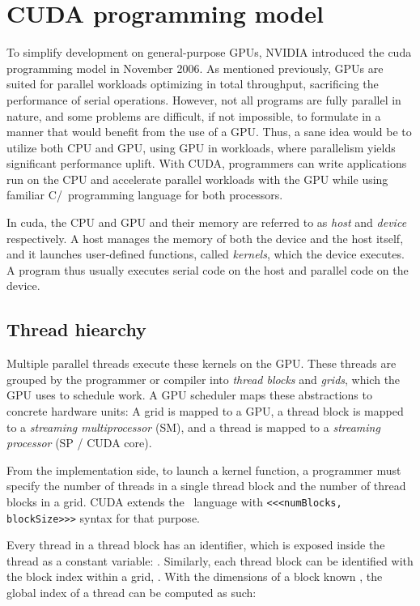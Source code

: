 \section{CUDA programming model} \label{label:cuda}

To simplify development on general-purpose GPUs, NVIDIA introduced the \acrfull{cuda} programming model in November 2006. As mentioned previously, GPUs are suited for parallel workloads optimizing in total throughput, sacrificing the performance of serial operations. However, not all programs are fully parallel in nature, and some problems are difficult, if not impossible, to formulate in a manner that would benefit from the use of a GPU. Thus, a sane idea would be to utilize both CPU and GPU, using GPU in workloads, where parallelism yields significant performance uplift. With CUDA, programmers can write applications run on the CPU and accelerate parallel workloads with the GPU while using familiar C/\CC\ programming language for both processors.

In \acrshort{cuda}, the CPU and GPU and their memory are referred to as \textit{host} and \textit{device} respectively. A host manages the memory of both the device and the host itself, and it launches user-defined functions, called \textit{kernels}, which the device executes. A program thus usually executes serial code on the host and parallel code on the device.

\subsection{Thread hiearchy}

Multiple parallel threads execute these kernels on the GPU. These threads are grouped by the programmer or compiler into \textit{thread blocks} and \textit{grids}, which the GPU uses to schedule work. A GPU scheduler maps these abstractions to concrete hardware units: A grid is mapped to a GPU, a thread block is mapped to a \textit{streaming multiprocessor} (SM), and a thread is mapped to a \textit{streaming processor} (SP / CUDA core).

From the implementation side, to launch a kernel function, a programmer must specify the number of threads in a single thread block and the number of thread blocks in a grid. CUDA extends the \CC\ language with \texttt{<<<numBlocks, blockSize>>>} syntax for that purpose.

Every thread in a thread block has an identifier, which is exposed inside the thread as a constant variable: . Similarly, each thread block can be identified with the block index within a grid, . With the dimensions of a block known , the global index of a thread can be computed as such:

